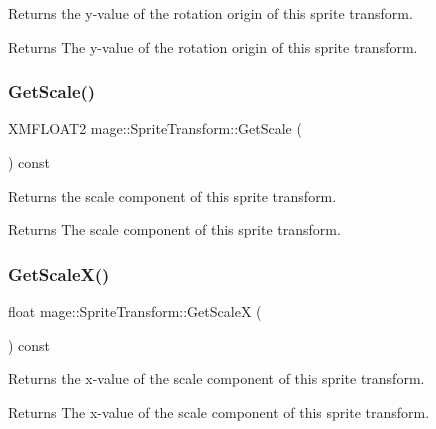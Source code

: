 Returns the y-\/value of the rotation origin of this sprite transform.

\begin{DoxyReturn}{Returns}
The y-\/value of the rotation origin of this sprite transform. 
\end{DoxyReturn}
\hypertarget{structmage_1_1_sprite_transform_ab9a7dcdbf3013960942ff98df313a92d}{}\label{structmage_1_1_sprite_transform_ab9a7dcdbf3013960942ff98df313a92d} 
\subsubsection{\texorpdfstring{Get\+Scale()}{GetScale()}}
{\footnotesize\ttfamily X\+M\+F\+L\+O\+A\+T2 mage\+::\+Sprite\+Transform\+::\+Get\+Scale (\begin{DoxyParamCaption}{ }\end{DoxyParamCaption}) const}

Returns the scale component of this sprite transform.

\begin{DoxyReturn}{Returns}
The scale component of this sprite transform. 
\end{DoxyReturn}
\hypertarget{structmage_1_1_sprite_transform_ae192203af55097b4e296ce0cb916cd97}{}\label{structmage_1_1_sprite_transform_ae192203af55097b4e296ce0cb916cd97} 
\subsubsection{\texorpdfstring{Get\+Scale\+X()}{GetScaleX()}}
{\footnotesize\ttfamily float mage\+::\+Sprite\+Transform\+::\+Get\+ScaleX (\begin{DoxyParamCaption}{ }\end{DoxyParamCaption}) const}

Returns the x-\/value of the scale component of this sprite transform.

\begin{DoxyReturn}{Returns}
The x-\/value of the scale component of this sprite transform. 
\end{DoxyReturn}
\hypertarget{structmage_1_1_sprite_transform_ad25f6881510e258a5afb00ae9ad7bc87}{}\label{structmage_1_1_sprite_transform_ad25f6881510e258a5afb00ae9ad7bc87} 
